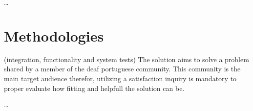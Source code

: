 \dots

\section{Methodologies}

(integration, functionality and system tests)
The solution aims to solve a problem shared by a member of the deaf portuguese community.
This community is the main target audience therefor, utilizing a satisfaction inquiry is mandatory to proper evaluate how fitting and helpfull the solution can be.  

\dots
